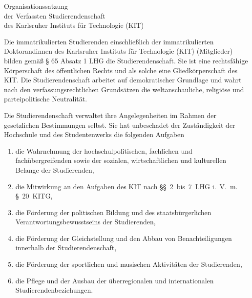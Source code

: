 

\begin{jurdoc}[Organisationssatzung]{Organisationssatzung\\der Verfassten Studierendenschaft\\des Karlsruher Instituts für Technologie (KIT)}
\setcounter{juratoclevel}{2}

%
%
Die immatrikulierten Studierenden einschließlich der immatrikulierten Doktorandinnen des Karlsruher Instituts für Technologie (KIT) (Mitglieder) bilden gemäß § 65 Absatz 1 LHG die Studierendenschaft. Sie ist eine rechtsfähige Körperschaft des öffentlichen Rechts und als solche eine Gliedkörperschaft des KIT. Die Studierendenschaft arbeitet auf demokratischer Grundlage und wahrt nach den verfassungsrechtlichen Grundsätzen die weltanschauliche, religiöse und parteipolitische Neutralität.


\label{studierendenschaft:aufgaben}

Die Studierendenschaft verwaltet ihre Angelegenheiten im Rahmen der gesetzlichen Bestimmungen selbst. Sie hat unbeschadet der Zuständigkeit der Hochschule und des Studentenwerks die folgenden Aufgaben
\begin{enumerate}
\item die Wahrnehmung der hochschulpolitischen, fachlichen und fachübergreifenden sowie der sozialen, wirtschaftlichen und kulturellen Belange der Studierenden,
\item die Mitwirkung an den Aufgaben des KIT nach §§~2~bis~7~LHG i.~V.~m. §~20~KITG,
\item die Förderung der politischen Bildung und des staatsbürgerlichen Verantwortungsbewusstseins der Studierenden,
\item die Förderung der Gleichstellung und den Abbau von Benachteiligungen innerhalb der Studierendenschaft,
\item die Förderung der sportlichen und musischen Aktivitäten der Studierenden,
\item die Pflege und der Ausbau der überregionalen und internationalen Studierendenbeziehungen.
\end{enumerate}


\end{jurdoc}
